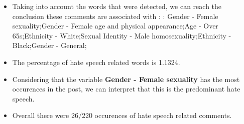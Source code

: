 \documentclass[11pt]{article}
\begin{document}
\begin{itemize}\item Taking into account the words that were detected, we can reach the conclusion these comments are associated with : : Gender - Female sexuality;Gender - Female age and physical appearance;Age - Over 65s;Ethnicity - White;Sexual Identity - Male homosexuality;Ethnicity - Black;Gender - General;%

\item The percentage of hate speech related words is 1.1324.

\item Considering that the variable \textbf{Gender - Female sexuality} has the most occurences in the post, we can interpret that this is the predominant hate speech.

\item Overall there were 26/220 occurences of hate speech related comments.\end{itemize}
\end{document}
